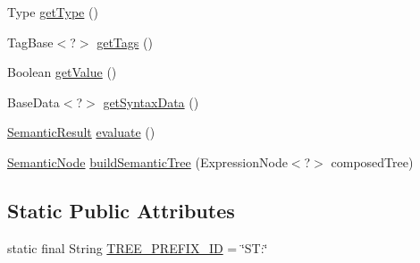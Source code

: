 \begin{DoxyCompactItemize}
\item 
Type \hyperlink{classit_1_1emarolab_1_1cagg_1_1core_1_1evaluation_1_1semanticGrammar_1_1SemanticTree_1_1SemanticNode_ab70173b1435b027e58364ce7fe07d338}{get\-Type} ()
\item 
Tag\-Base$<$?$>$ \hyperlink{classit_1_1emarolab_1_1cagg_1_1core_1_1evaluation_1_1semanticGrammar_1_1SemanticTree_1_1SemanticNode_ad0164bcc5d610dc2678795ebf64cce93}{get\-Tags} ()
\item 
Boolean \hyperlink{classit_1_1emarolab_1_1cagg_1_1core_1_1evaluation_1_1semanticGrammar_1_1SemanticTree_1_1SemanticNode_adc5070175f35aa69675570e8732b9766}{get\-Value} ()
\item 
Base\-Data$<$?$>$ \hyperlink{classit_1_1emarolab_1_1cagg_1_1core_1_1evaluation_1_1semanticGrammar_1_1SemanticTree_1_1SemanticNode_a353d667e49b36c3a18660b52497e283d}{get\-Syntax\-Data} ()
\item 
\hyperlink{classit_1_1emarolab_1_1cagg_1_1core_1_1evaluation_1_1semanticGrammar_1_1syntaxCompiler_1_1Semant5d395032261986aec1b33357dd21b6bb}{Semantic\-Result} \hyperlink{classit_1_1emarolab_1_1cagg_1_1core_1_1evaluation_1_1semanticGrammar_1_1SemanticTree_1_1SemanticNode_a6eb0e0944fdd9a50a55000ad8386b31b}{evaluate} ()
\item 
\hyperlink{classit_1_1emarolab_1_1cagg_1_1core_1_1evaluation_1_1semanticGrammar_1_1SemanticTree_1_1SemanticNode}{Semantic\-Node} \hyperlink{classit_1_1emarolab_1_1cagg_1_1core_1_1evaluation_1_1semanticGrammar_1_1SemanticTree_1_1SemanticNode_a54f1555f4273c796eed25e7ff82d45d8}{build\-Semantic\-Tree} (Expression\-Node$<$?$>$ composed\-Tree)
\end{DoxyCompactItemize}
\subsection*{Static Public Attributes}
\begin{DoxyCompactItemize}
\item 
static final String \hyperlink{classit_1_1emarolab_1_1cagg_1_1core_1_1evaluation_1_1semanticGrammar_1_1SemanticTree_1_1SemanticNode_a2f62c4bca2096d848d6c1faf65df2dcf}{T\-R\-E\-E\-\_\-\-P\-R\-E\-F\-I\-X\-\_\-\-I\-D} = \char`\"{}S\-T\-:\char`\"{}
\end{DoxyCompactItemize}
